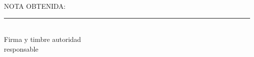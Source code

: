 \hfill
\begin{minipage}{0.5\textwidth}
    \Large
        
    NOTA OBTENIDA: 

    \vspace{3cm}
    
    \rule{6.6cm}{0.4pt} \\
    Firma y timbre autoridad \\ responsable
\end{minipage}
\vfill
